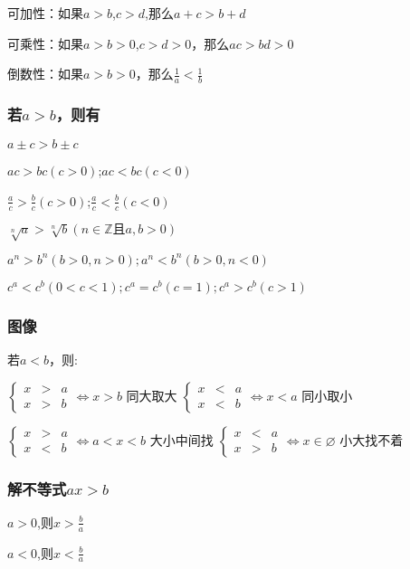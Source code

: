 \documentclass[UTF8]{ctexart}
\begin{document}
可加性：如果$a> b$,$c> d$,那么$a+c> b+d$

可乘性：如果$a> b> 0$,$c> d> 0$，那么$ac> bd> 0$

倒数性：如果$a> b> 0$，那么$\frac{1}{a} < \frac{1}{b}$

\subsubsection{若$a> b$，则有}

$a\pm c> b\pm c$

$ac> bc(c> 0)$;$ac< bc(c< 0)$

$\frac{a}{c} > \frac{b}{c} (c> 0)$;$\frac{a}{c}< \frac{b}{c}(c< 0)$

$\sqrt[n]{a}  > \sqrt[n]{b} (n \in \mathbb{Z} \text {且} a,b> 0)$

$a^n> b^n(b> 0,n> 0);a^n< b^n(b> 0,n< 0)$

$c^a< c^b(0< c< 1);c^a=c^b(c=1);c^a> c^b(c> 1)$

\subsubsection{图像}

若$a< b$，则:

$\left\{\begin{matrix}
 x & >  &a\\
 x & >  &b
\end{matrix}\right.\Leftrightarrow x> b$   同大取大 \qquad  $\left\{\begin{matrix}
 x & <  &a \\
 x & <  &b
\end{matrix}\right.\Leftrightarrow x< a$   同小取小

$\left\{\begin{matrix}
 x & >  &a \\
 x & <  &b
\end{matrix}\right.\Leftrightarrow a< x< b$   大小中间找 \qquad $\left\{\begin{matrix}
 x & <  &a \\
 x & >  &b
\end{matrix}\right.\Leftrightarrow x\in  \varnothing$  小大找不着

\subsubsection{解不等式$ax >b$}

$a > 0$,则$x> \frac{b}{a}$
 
$a< 0$,则$x< \frac{b}{a} $
\end{document}
